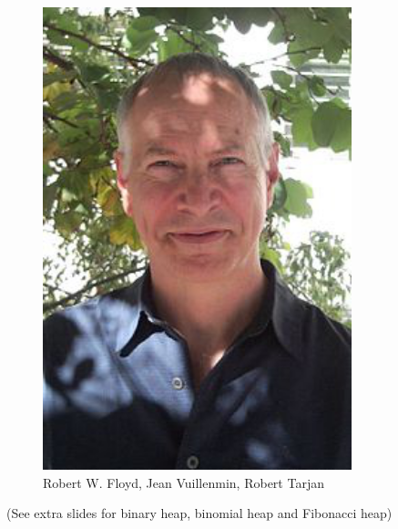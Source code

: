 \documentclass[mathserif]{beamer}
\begin{document}
{\begin{figure}
\begin{minipage}{0.30\textwidth}
 \end{minipage}
 \begin{minipage}{0.30\textwidth}
     \includegraphics[width=0.8\textwidth]{Tarjan.png}
 \end{minipage}
 \caption{ Robert W. Floyd, Jean Vuillenmin, Robert Tarjan}
 \end{figure}

(See extra slides for binary heap, binomial heap and Fibonacci heap)
} 


\end{document}
